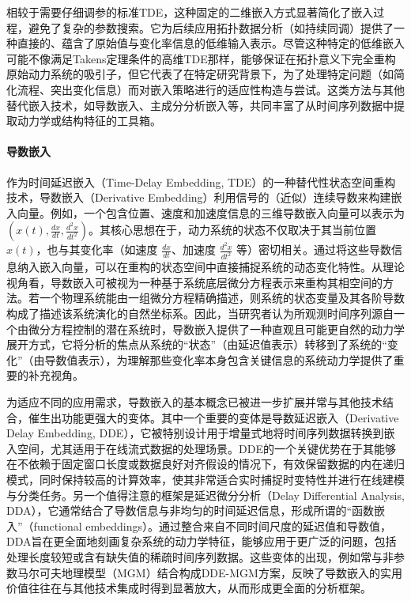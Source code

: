 相较于需要仔细调参的标准TDE，这种固定的二维嵌入方式显著简化了嵌入过程，避免了复杂的参数搜索。它为后续应用拓扑数据分析（如持续同调）提供了一种直接的、蕴含了原始值与变化率信息的低维输入表示。尽管这种特定的低维嵌入可能不像满足Takens定理条件的高维TDE那样，能够保证在拓扑意义下完全重构原始动力系统的吸引子，但它代表了在特定研究背景下，为了处理特定问题（如简化流程、突出变化信息）而对嵌入策略进行的适应性构造与尝试。这类方法与其他替代嵌入技术，如导数嵌入、主成分分析嵌入等，共同丰富了从时间序列数据中提取动力学或结构特征的工具箱。

\paragraph{导数嵌入} %
作为时间延迟嵌入（Time-Delay Embedding, TDE）的一种替代性状态空间重构技术，导数嵌入\cite{lekscha2018phase}（Derivative Embedding）利用信号的（近似）连续导数来构建嵌入向量。例如，一个包含位置、速度和加速度信息的三维导数嵌入向量可以表示为 $(x(t), \frac{dx}{dt}, \frac{d^2x}{dt^2})$。其核心思想在于，动力系统的状态不仅取决于其当前位置 $x(t)$，也与其变化率（如速度 $\frac{dx}{dt}$、加速度 $\frac{d^2x}{dt^2}$ 等）密切相关。通过将这些导数信息纳入嵌入向量，可以在重构的状态空间中直接捕捉系统的动态变化特性。从理论视角看，导数嵌入可被视为一种基于系统底层微分方程表示来重构其相空间的方法。若一个物理系统能由一组微分方程精确描述，则系统的状态变量及其各阶导数构成了描述该系统演化的自然坐标系。因此，当研究者认为所观测时间序列源自一个由微分方程控制的潜在系统时，导数嵌入提供了一种直观且可能更自然的动力学展开方式，它将分析的焦点从系统的“状态”（由延迟值表示）转移到了系统的“变化”（由导数值表示），为理解那些变化率本身包含关键信息的系统动力学提供了重要的补充视角。

为适应不同的应用需求，导数嵌入的基本概念已被进一步扩展并常与其他技术结合，催生出功能更强大的变体。其中一个重要的变体是导数延迟嵌入（Derivative Delay Embedding, DDE），它被特别设计用于增量式地将时间序列数据转换到嵌入空间，尤其适用于在线流式数据的处理场景。DDE的一个关键优势在于其能够在不依赖于固定窗口长度或数据良好对齐假设的情况下，有效保留数据的内在递归模式，同时保持较高的计算效率，使其非常适合实时捕捉时变特性并进行在线建模与分类任务。另一个值得注意的框架是延迟微分分析（Delay Differential Analysis, DDA），它通常结合了导数信息与非均匀的时间延迟信息，形成所谓的“函数嵌入”（functional embeddings）。通过整合来自不同时间尺度的延迟值和导数值，DDA旨在更全面地刻画复杂系统的动力学特征，能够应用于更广泛的问题，包括处理长度较短或含有缺失值的稀疏时间序列数据。这些变体的出现，例如常与非参数马尔可夫地理模型（MGM）结合构成DDE-MGM方案，反映了导数嵌入的实用价值往往在与其他技术集成时得到显著放大，从而形成更全面的分析框架。

